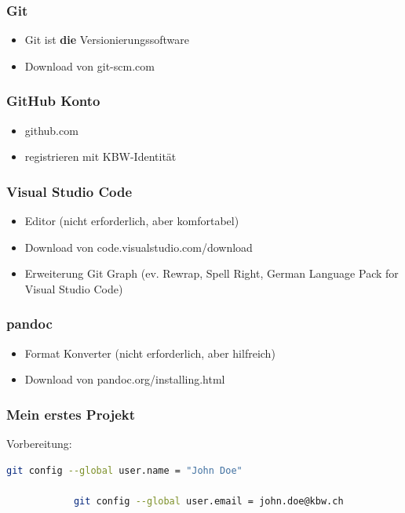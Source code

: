 \documentclass[table]{beamer}
\begin{document}
    \begin{frame}
        \frametitle{Git}

        \begin{itemize}
            \item Git ist \textbf{die} Versionierungssoftware
            \item Download von git-scm.com 
        \end{itemize}
    
    \end{frame}

    \begin{frame}
        \frametitle{GitHub Konto}

        \begin{itemize}
            \item github.com 
            \item registrieren mit KBW-Identität
        \end{itemize}
    \end{frame}

    \begin{frame}
        \frametitle{Visual Studio Code}

        \begin{itemize}
            \item Editor (nicht erforderlich, aber komfortabel)
            \item Download von code.visualstudio.com/download 
            \item Erweiterung Git Graph (ev. Rewrap, Spell Right, German
            Language Pack for Visual Studio Code)
        \end{itemize}
    
    \end{frame}

    \begin{frame}
        \frametitle{pandoc}

        \begin{itemize}
            \item Format Konverter (nicht erforderlich, aber hilfreich)
            \item Download von pandoc.org/installing.html
        \end{itemize}   
            
    \end{frame}

    \begin{frame}[fragile]
        \frametitle{Mein erstes Projekt}

        Vorbereitung:

        \begin{lstlisting}[language=Bash]
            git config --global user.name = "John Doe"

            git config --global user.email = john.doe@kbw.ch
        \end{lstlisting}       
    
        
    
    \end{frame}
\end{document}
